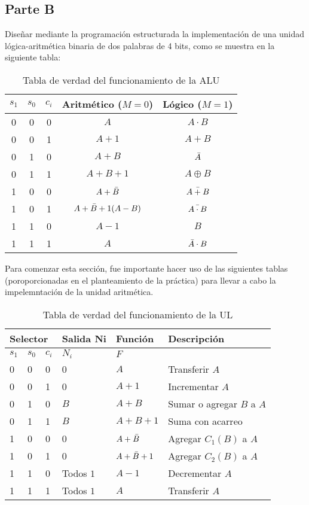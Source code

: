 \documentclass[../procedimientos.tex]{subfiles}
\begin{document}
\clearpage
\subsection{Parte B}
\begin{em}
  Diseñar mediante la programación estructurada la implementación de una unidad 
  lógica-aritmética binaria de dos palabras de 4 bits, como se muestra en la 
  siguiente tabla:
\end{em}
\begin{table}[H]
  \centering
  \begin{tabular}{ccc|c|c}
    \hline
    $s_1$ & $s_0$ & $c_i$ & Aritmético ($M=0$) & Lógico ($M=1$)\\
    \hline
    0 & 0 & 0 & $A$ & $A \cdot B$\\
    0 & 0 & 1 & $A+1$ & $A + B$\\
    0 & 1 & 0 & $A+B$ & $\bar{A}$\\
    0 & 1 & 1 & $A+B+1$ & $A \oplus B$\\
    1 & 0 & 0 & $A+\bar{B}$ & $\bar{A + B}$\\
    1 & 0 & 1 & $A+\bar{B}+1(A-B)$ & $\bar{A \cdot B}$\\
    1 & 1 & 0 & $A-1$ & $B$\\
    1 & 1 & 1 & $A$ & $\bar{A} \cdot B$
  \end{tabular}
  \caption{Tabla de verdad del funcionamiento de la ALU}
  \label{tab:ul_func}
\end{table}

Para comenzar esta sección, fue importante hacer uso de las siguientes tablas 
(poroporcionadas en el planteamiento de la práctica) para llevar a cabo la 
impelemntación de la unidad aritmética.
\begin{table}[H]
  \centering
  \begin{tabular}{p{1cm}p{1cm}p{1cm}|p{2cm}|p{2cm}|p{6cm}}
    \hline
    \multicolumn{3}{p{3cm}|}{\textbf{Selector}} & \textbf{Salida Ni} & 
    \textbf{Función} & \textbf{Descripción}\\
    \hline
    $s_1$ & $s_0$ & $c_i$ & $N_i$ & $F$\\
    \hline
    0 & 0 & 0 & 0 & $A$ & Transferir $A$\\
    0 & 0 & 1 & 0 & $A + 1$ & Incrementar $A$\\
    0 & 1 & 0 & $B$ & $A + B$ & Sumar o agregar $B$ a $A$\\
    0 & 1 & 1 & $B$ & $A + B + 1$ & Suma con acarreo\\
    1 & 0 & 0 & 0 & $A + \bar{B}$ & Agregar $C_1(B)$ a $A$\\
    1 & 0 & 1 & 0 & $A + \bar{B} + 1$ & Agregar $C_2(B)$ a $A$\\
    1 & 1 & 0 & Todos $1$ & $A - 1$ & Decrementar $A$\\
    1 & 1 & 1 & Todos $1$ & $A$ & Transferir $A$\\
  \end{tabular}
  \caption{Tabla de verdad del funcionamiento de la UL}
  \label{tab:ua_func}
\end{table}
\end{document}
